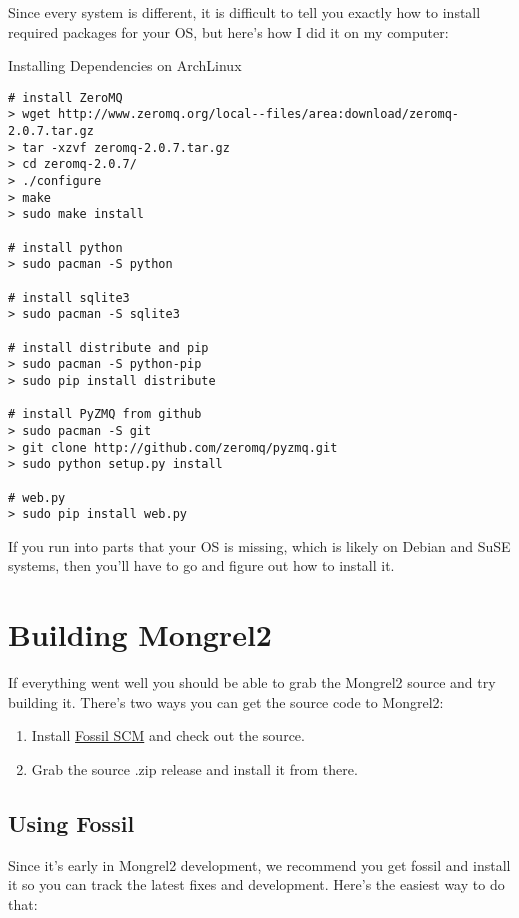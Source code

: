 Since every system is different, it is difficult to tell you exactly how to
install required packages for your OS, but here's how I did it on my computer:


\begin{code}{Installing Dependencies on ArchLinux}
\begin{Verbatim}
# install ZeroMQ
> wget http://www.zeromq.org/local--files/area:download/zeromq-2.0.7.tar.gz
> tar -xzvf zeromq-2.0.7.tar.gz
> cd zeromq-2.0.7/
> ./configure
> make
> sudo make install

# install python
> sudo pacman -S python

# install sqlite3
> sudo pacman -S sqlite3

# install distribute and pip
> sudo pacman -S python-pip
> sudo pip install distribute

# install PyZMQ from github
> sudo pacman -S git
> git clone http://github.com/zeromq/pyzmq.git
> sudo python setup.py install

# web.py
> sudo pip install web.py
\end{Verbatim}
\end{code}

If you run into parts that your OS is missing, which is likely on
Debian and SuSE systems, then you'll have to go and figure out
how to install it.


\section{Building Mongrel2}

If everything went well you should be able to grab the Mongrel2 source
and try building it.  There's two ways you can get the source code to
Mongrel2:

\begin{enumerate}
\item Install \href{http://fossil-scm.org}{Fossil SCM} and check out the source.
\item Grab the source .zip release and install it from there.
\end{enumerate}

\subsection{Using Fossil}

Since it's early in Mongrel2 development, we recommend you get fossil and install it
so you can track the latest fixes and development.  Here's the easiest way to
do that:

